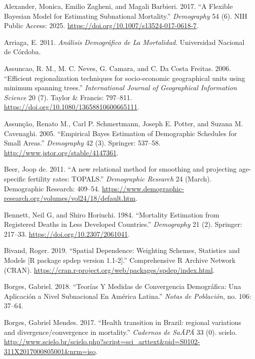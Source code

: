 \documentclass[12pt,]{article}
\begin{document}
\hypertarget{refs}{}
\leavevmode\hypertarget{ref-Alexander2017}{}%
Alexander, Monica, Emilio Zagheni, and Magali Barbieri. 2017. ``A
Flexible Bayesian Model for Estimating Subnational Mortality.''
\emph{Demography} 54 (6). NIH Public Access: 2025.
\url{https://doi.org/10.1007/s13524-017-0618-7}.

\leavevmode\hypertarget{ref-Arriaga2011}{}%
Arriaga, E. 2011. \emph{Análisis Demográfico de La Mortalidad}.
Universidad Nacional de Córdoba.

\leavevmode\hypertarget{ref-AssunCao2006}{}%
Assuncao, R. M., M. C. Neves, G. Camara, and C. Da Costa Freitas. 2006.
``Efficient regionalization techniques for socio-economic geographical
units using minimum spanning trees.'' \emph{International Journal of
Geographical Information Science} 20 (7). Taylor \& Francis: 797--811.
\url{https://doi.org/10.1080/13658810600665111}.

\leavevmode\hypertarget{ref-Assuncao2005}{}%
Assunção, Renato M., Carl P. Schmertmann, Joseph E. Potter, and Suzana
M. Cavenaghi. 2005. ``Empirical Bayes Estimation of Demographic
Schedules for Small Areas.'' \emph{Demography} 42 (3). Springer:
537--58. \url{http://www.jstor.org/stable/4147361}.

\leavevmode\hypertarget{ref-deBeer2011}{}%
Beer, Joop de. 2011. ``A new relational method for smoothing and
projecting age-specific fertility rates: TOPALS.'' \emph{Demographic
Research} 24 (March). Demographic Research: 409--54.
\url{https://www.demographic-research.org/volumes/vol24/18/default.htm}.

\leavevmode\hypertarget{ref-Bennett_Horiuchi_1984}{}%
Bennett, Neil G, and Shiro Horiuchi. 1984. ``Mortality Estimation from
Registered Deaths in Less Developed Countries.'' \emph{Demography} 21
(2). Springer: 217--33. \url{https://doi.org/10.2307/2061041}.

\leavevmode\hypertarget{ref-Bivand2019}{}%
Bivand, Roger. 2019. ``Spatial Dependence: Weighting Schemes, Statistics
and Models {[}R package spdep version 1.1-2{]}.'' Comprehensive R
Archive Network (CRAN).
\url{https://cran.r-project.org/web/packages/spdep/index.html}.

\leavevmode\hypertarget{ref-Borges2018}{}%
Borges, Gabriel. 2018. ``Teorías Y Medidas de Convergencia Demográfica:
Una Aplicación a Nivel Subnacional En América Latina.'' \emph{Notas de
Población}, no. 106: 37--64.

\leavevmode\hypertarget{ref-Borges2017}{}%
Borges, Gabriel Mendes. 2017. ``Health transition in Brazil: regional
variations and divergence/convergence in mortality.'' \emph{Cadernos de
SaÃPÃ} 33 (0). scielo.
\url{http://www.scielo.br/scielo.php?script=sci_arttext\&pid=S0102-311X2017000805001\&nrm=iso}.
\end{document}
